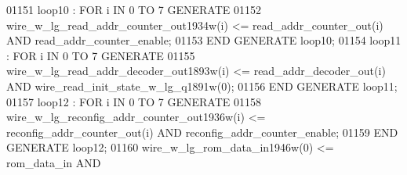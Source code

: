 \begin{DoxyCode}
{01151     \textcolor{vhdlchar}{loop10} \textcolor{vhdlchar}{:} \textcolor{keywordflow}{FOR} \textcolor{vhdlchar}{i} \textcolor{keywordflow}{IN} \textcolor{vhdllogic}{}\textcolor{vhdllogic}{0} \textcolor{keywordflow}{TO} \textcolor{vhdllogic}{}\textcolor{vhdllogic}{7} \textcolor{keywordflow}{GENERATE} 
01152         \textcolor{vhdlchar}{wire_w_lg_read_addr_counter_out1934w}\textcolor{vhdlchar}{(}\textcolor{vhdlchar}{i}\textcolor{vhdlchar}{)} \textcolor{vhdlchar}{<=} \textcolor{vhdlchar}{read_addr_counter_out}\textcolor{vhdlchar}{(}\textcolor{vhdlchar}{i}\textcolor{vhdlchar}{)} \textcolor{keywordflow}{AND} \textcolor{vhdlchar}{
      read_addr_counter_enable};
01153     \textcolor{keywordflow}{END} \textcolor{keywordflow}{GENERATE} \textcolor{vhdlchar}{loop10};
01154     \textcolor{vhdlchar}{loop11} \textcolor{vhdlchar}{:} \textcolor{keywordflow}{FOR} \textcolor{vhdlchar}{i} \textcolor{keywordflow}{IN} \textcolor{vhdllogic}{}\textcolor{vhdllogic}{0} \textcolor{keywordflow}{TO} \textcolor{vhdllogic}{}\textcolor{vhdllogic}{7} \textcolor{keywordflow}{GENERATE} 
01155         \textcolor{vhdlchar}{wire_w_lg_read_addr_decoder_out1893w}\textcolor{vhdlchar}{(}\textcolor{vhdlchar}{i}\textcolor{vhdlchar}{)} \textcolor{vhdlchar}{<=} \textcolor{vhdlchar}{read_addr_decoder_out}\textcolor{vhdlchar}{(}\textcolor{vhdlchar}{i}\textcolor{vhdlchar}{)} \textcolor{keywordflow}{AND} \textcolor{vhdlchar}{
      wire_read_init_state_w_lg_q1891w}\textcolor{vhdlchar}{(}\textcolor{vhdllogic}{}\textcolor{vhdllogic}{0}\textcolor{vhdlchar}{)};
01156     \textcolor{keywordflow}{END} \textcolor{keywordflow}{GENERATE} \textcolor{vhdlchar}{loop11};
01157     \textcolor{vhdlchar}{loop12} \textcolor{vhdlchar}{:} \textcolor{keywordflow}{FOR} \textcolor{vhdlchar}{i} \textcolor{keywordflow}{IN} \textcolor{vhdllogic}{}\textcolor{vhdllogic}{0} \textcolor{keywordflow}{TO} \textcolor{vhdllogic}{}\textcolor{vhdllogic}{7} \textcolor{keywordflow}{GENERATE} 
01158         \textcolor{vhdlchar}{wire_w_lg_reconfig_addr_counter_out1936w}\textcolor{vhdlchar}{(}\textcolor{vhdlchar}{i}\textcolor{vhdlchar}{)} \textcolor{vhdlchar}{<=} \textcolor{vhdlchar}{reconfig_addr_counter_out}\textcolor{vhdlchar}{(}\textcolor{vhdlchar}{i}\textcolor{vhdlchar}{)} \textcolor{keywordflow}{AND} \textcolor{vhdlchar}{
      reconfig_addr_counter_enable};
01159     \textcolor{keywordflow}{END} \textcolor{keywordflow}{GENERATE} \textcolor{vhdlchar}{loop12};
01160     \textcolor{vhdlchar}{wire_w_lg_rom_data_in1946w}\textcolor{vhdlchar}{(}\textcolor{vhdllogic}{}\textcolor{vhdllogic}{0}\textcolor{vhdlchar}{)} \textcolor{vhdlchar}{<=} \textcolor{vhdlchar}{rom_data_in} \textcolor{keywordflow}{AND} \textcolor{vhdlchar}{
}}
\end{DoxyCode}
